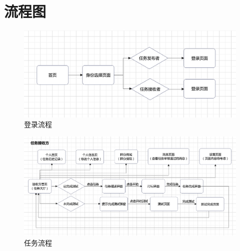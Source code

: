 \section{流程图}

\begin{figure}[h!]
    \centering
    \includegraphics[width=\linewidth]{imgs/userflow.png}
    \caption{登录流程}
    \label{fig:loginflow}
\end{figure}

\begin{figure}[h!]
    \centering
    \includegraphics[width=\linewidth]{imgs/answerflow.png}
    \caption{任务流程}
    \label{fig:answerflow}
\end{figure}